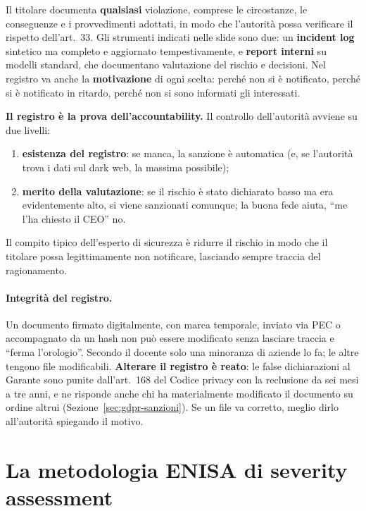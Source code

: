 Il titolare documenta \textbf{qualsiasi} violazione, comprese le circostanze, le conseguenze e i
provvedimenti adottati, in modo che l'autorità possa verificare il rispetto dell'art.~33. Gli strumenti
indicati nelle slide sono due: un \textbf{incident log} sintetico ma completo e aggiornato
tempestivamente, e \textbf{report interni} su modelli standard, che documentano valutazione del rischio e
decisioni. Nel registro va anche la \textbf{motivazione} di ogni scelta: perché non si è notificato,
perché si è notificato in ritardo, perché non si sono informati gli interessati.

\begin{esame}
\textbf{Il registro è la prova dell'accountability.} Il controllo dell'autorità avviene su due livelli:
\begin{enumerate}
  \item \textbf{esistenza del registro}: se manca, la sanzione è automatica (e, se l'autorità trova i dati
    sul dark web, la massima possibile);
  \item \textbf{merito della valutazione}: se il rischio è stato dichiarato basso ma era evidentemente
    alto, si viene sanzionati comunque; la buona fede aiuta, ``me l'ha chiesto il CEO'' no.
\end{enumerate}
Il compito tipico dell'esperto di sicurezza è ridurre il rischio in modo che il titolare possa
legittimamente non notificare, lasciando sempre traccia del ragionamento.
\end{esame}

\paragraph{Integrità del registro.} Un documento firmato digitalmente, con marca temporale, inviato via
PEC o accompagnato da un hash non può essere modificato senza lasciare traccia e ``ferma l'orologio''.
Secondo il docente solo una minoranza di aziende lo fa; le altre tengono file modificabili.
\textbf{Alterare il registro è reato}: le false dichiarazioni al Garante sono punite dall'art.~168 del
Codice privacy con la reclusione da sei mesi a tre anni, e ne risponde anche chi ha materialmente
modificato il documento su ordine altrui (Sezione~\ref{sec:gdpr-sanzioni}). Se un file va corretto,
meglio dirlo all'autorità spiegando il motivo.

\section{La metodologia ENISA di severity assessment}
\label{sec:breach-enisa}

